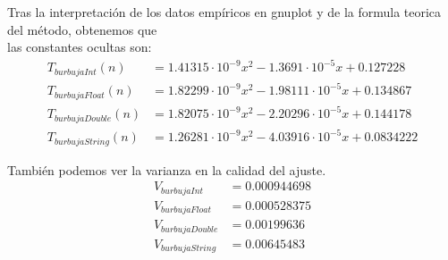 \documentclass[11pt,openany]{book}
\begin{document}
Tras la interpretación de los datos empíricos en gnuplot y de la formula teorica del método, obtenemos que \\
las constantes ocultas son:
\begin{align*}
    T_{burbujaInt}(n) &=1.41315 \cdot 10^{-9}x^{2}-1.3691 \cdot 10^{-5}x+0.127228 \\
    T_{burbujaFloat}(n) &=1.82299 \cdot 10^{-9}x^{2}-1.98111 \cdot 10^{-5}x+0.134867 \\
    T_{burbujaDouble}(n) &=1.82075 \cdot 10^{-9}x^{2}-2.20296 \cdot 10^{-5}x+0.144178 \\
    T_{burbujaString}(n) &=1.26281 \cdot 10^{-9}x^{2}-4.03916 \cdot 10^{-5}x+0.0834222 
\end{align*}


También podemos ver la varianza en la calidad del ajuste. 
\begin{align*}
    V_{burbujaInt}&=0.000944698 \\
    V_{burbujaFloat}&=0.000528375 \\
    V_{burbujaDouble}&=0.00199636 \\
    V_{burbujaString}&=0.00645483
\end{align*}
\end{document}
